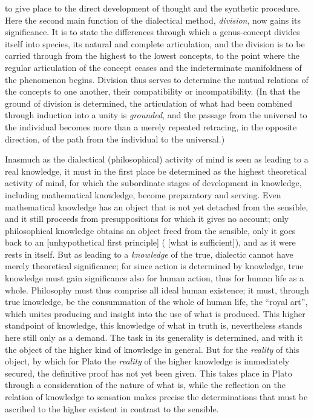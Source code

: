 to give place to the direct development of thought and the synthetic procedure. Here the second main function of the dialectical method,
\emph{division}, now gains its significance. It
is to state the differences through which a genus-concept divides
itself into species, its natural and complete articulation, and the division is to be carried through from the highest to the lowest concepts, to the point where the regular articulation of the concept
ceases and the indeterminate manifoldness of the phenomenon begins.
Division thus serves to determine the mutual relations of the concepts to one another, their compatibility or incompatibility. (In that the ground of division is determined, the articulation of what had been combined through induction
into a unity is \emph{grounded}, and the passage from the universal to the individual becomes
more than a merely repeated retracing, in the opposite direction,
of the path from the individual to the universal.)

Inasmuch as the dialectical (philosophical) activity of mind is seen
as leading to a real knowledge, it must in the first place be determined as the highest theoretical activity of mind, for
which the subordinate stages of development in knowledge, including
mathematical knowledge, become preparatory and serving.
Even mathematical knowledge has an object that
is not yet detached from the sensible, and it still proceeds
from presuppositions for which it gives no account;
only philosophical knowledge obtains an object freed from the
sensible, only it goes back to an  [unhypothetical first principle] ( [what is sufficient]), and as it were rests in itself. But as
leading to a \emph{knowledge} of the true, dialectic cannot have merely
theoretical significance; for since action is determined
by knowledge, true knowledge must gain significance
also for human action, thus for human life
as a whole. Philosophy must thus comprise all ideal
human existence; it must, through true knowledge,
be the consummation of the whole of human life, the ``royal art'', which unites producing and insight into the use of
what is produced.
This higher standpoint of knowledge, this knowledge of
what in truth is, nevertheless stands here still only as a
demand. The task in its generality is determined, and with
it the object of the higher kind of knowledge in general.
But for the \emph{reality} of this object, by which for
Plato the \emph{reality} of the higher knowledge is immediately
secured, the definitive proof has not yet been given. This
takes place in Plato through a consideration of the nature of what
is, while the reflection on the relation of knowledge to sensation
makes precise the determinations that must be ascribed to the higher
existent in contrast to the sensible.

